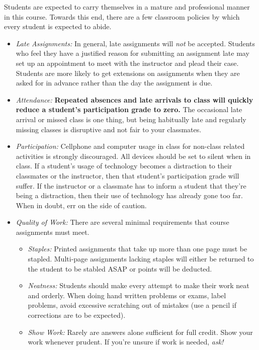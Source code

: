 \documentclass[10pt]{article}
\begin{document}
Students are expected to carry themselves in a mature and professional manner in this course. Towards this end, there are a few classroom policies by which every student is expected to abide.
\begin{itemize}

\item \textit{Late Assignments: } In general, late assignments will \textit{not} be accepted.  Students who feel they have a justified reason for submitting an assignment late may set up an appointment to meet with the instructor and plead their case.  Students are more likely to get extensions on assignments when they are asked for in advance rather than the day the assignment is due.

\item \textit{Attendance: } \textbf{Repeated absences and late arrivals to class will quickly reduce a student's participation grade to zero.}  The occasional late arrival or missed class is one thing, but being habitually late and regularly missing classes is disruptive and not fair to your classmates.

\item \textit{Participation: }  Cellphone and computer usage in class for non-class related activities is strongly discouraged.  All devices should be set to silent when in class.  If a student's usage of technology becomes a distraction to their classmates or the instructor, then that student's participation grade will suffer.  If the instructor or a classmate has to inform a student that they're being a distraction, then their use of technology has already gone too far.  When in doubt, err on the side of caution.

\item \textit{Quality of Work:} There are several minimal requirements that course assignments must meet.
\begin{itemize}

\item \textit{Staples:} Printed assignments that take up more than one page must be stapled.  Multi-page  assignments lacking staples will either be returned to the student to be stabled ASAP or points will be deducted.

\item \textit{Neatness:}  Students should make every attempt to make their work neat and orderly. When doing hand written problems or exams, label problems, avoid excessive scratching out of mistakes (use a pencil if corrections are to be expected).

\item \textit{Show Work:} Rarely are answers alone sufficient for full credit.  Show your work whenever prudent.  If you're unsure if work is needed, \textit{ask!}
\end{itemize}

\end{itemize}
\end{document}
